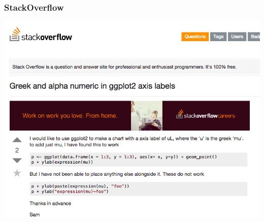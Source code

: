 \documentclass{beamer}\usepackage[]{graphicx}\usepackage[]{color}
\begin{document}

\begin{frame}[fragile]
\frametitle{StackOverflow}
\begin{center}
\includegraphics[scale=.35]{images/stackoverflow.png}
\end{center}
\end{frame}

\end{document}
